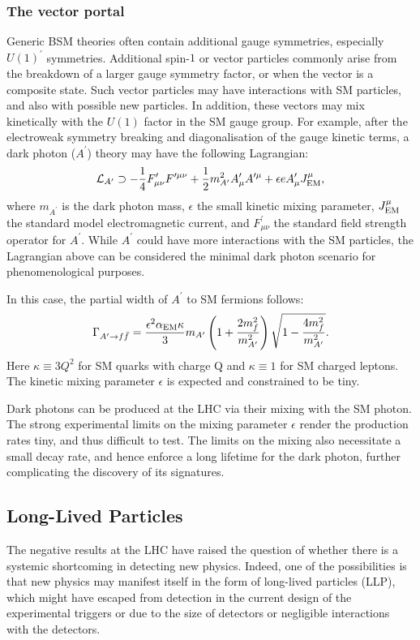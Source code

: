 \documentclass[10pt]{article}
\begin{document}
\subsubsection{The vector portal} 
%
Generic BSM theories often contain additional gauge symmetries, especially $U(1)^\prime$ symmetries. 
Additional spin-$1$ or vector particles commonly arise from the breakdown of a larger gauge symmetry factor, or when the vector is a composite state. 
Such vector particles may have interactions with SM particles, and also with possible new particles.
In addition, these vectors may mix kinetically with the $U(1)$ factor in the SM gauge group. 
For example, after the electroweak symmetry breaking and diagonalisation of the gauge kinetic terms, a dark photon ($A^\prime$) theory may have the following Lagrangian:
%
\begin{equation}
\mathcal{L}_{A^\prime} \supset -\frac 1 4 F^\prime_{\mu\nu} F^{\prime \mu\nu} + \frac 1 2 m_{A^\prime}^2 A^\prime_\mu A^{\prime \mu} + \epsilon e A^\prime_{\mu} J_{\rm EM}^\mu,
\end{equation}
%
where $m_{A^\prime}$ is the dark photon mass, $\epsilon$ the small kinetic mixing parameter, $J^\mu_{\rm EM}$ the standard model electromagnetic current, and $F^\prime_{\mu\nu}$ the standard field strength operator for $A^\prime$. While $A^\prime$ could have more interactions with the SM particles, the Lagrangian above can be considered the minimal dark photon scenario for phenomenological purposes. 

In this case, the partial width of $A^\prime$ to SM fermions follows:
%
\begin{equation}
\Gamma_{A^\prime\to f\bar f}=\frac {\epsilon^2 \alpha_{\rm EM} \kappa} {3} m_{A^\prime} \left(1+ \frac {2m_f^2} {m_{A^\prime}^2}\right) \sqrt{1-\frac {4 m_f^2}{m_{A^\prime}^2}}.
\end{equation}
%
Here $\kappa\equiv 3 Q^2$ for SM quarks with charge Q and $\kappa\equiv 1$ for SM charged leptons. The kinetic mixing parameter $\epsilon$ is expected and constrained to be tiny. 

Dark photons can be produced at the LHC via their mixing with the SM photon. The strong experimental limits on the mixing parameter $\epsilon$ render the production rates tiny, and thus difficult to test.
The limits on the mixing also necessitate a small decay rate, and hence enforce a long lifetime for the dark photon, further complicating the discovery of its signatures.


\subsection{Long-Lived Particles}
%
The negative results at the LHC have raised the question of whether there is a systemic shortcoming in detecting new physics. 
Indeed, one of the possibilities is that new physics may manifest itself in the form of long-lived particles (LLP), which might have escaped from detection in the current design of the experimental triggers or due to the size of detectors or negligible interactions with the detectors.  
\end{document}
